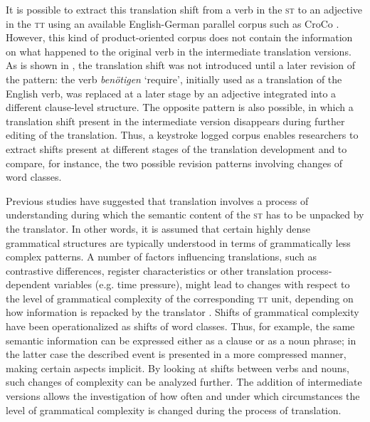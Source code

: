 \documentclass[output=paper]{LSP/langsci}
\begin{document}
It is possible to extract this translation shift from a verb in the \textsc{st} to an adjective in the \textsc{tt} using an available English-German parallel corpus such as CroCo \citep{Hansen-Schirra2012}. However, this kind of product-oriented corpus does not contain the information on what happened to the original verb in the intermediate translation versions. As is shown in , the translation shift was not introduced until a later revision of the pattern: the verb \textit{benötigen} `require', initially used as a translation of the English verb, was replaced at a later stage by an adjective integrated into a different clause-level structure. The opposite pattern is also possible, in which a translation shift present in the intermediate version disappears during further editing of the translation. Thus, a keystroke logged corpus enables researchers to extract shifts present at different stages of the translation development and to compare, for instance, the two possible revision patterns involving changes of word classes.
  
Previous studies have suggested that translation involves a process of understanding during which the semantic content of the \textsc{st} has to be unpacked by the translator. In other words, it is assumed that certain highly dense grammatical structures are typically understood in terms of grammatically less complex patterns. A number of factors influencing translations, such as contrastive differences, register characteristics or other translation process-dependent variables (e.g. time pressure), might lead to changes with respect to the level of grammatical complexity of the corresponding \textsc{tt} unit, depending on how information is repacked by the translator \citep{Steiner2001,Hansen-Schirra2012}. Shifts of grammatical complexity have been operationalized as shifts of word classes. Thus, for example, the same semantic information can be expressed either as a clause or as a noun phrase; in the latter case the described event is presented in a more compressed manner, making certain aspects implicit. By looking at shifts between verbs and nouns, such changes of complexity can be analyzed further. The addition of intermediate versions allows the investigation of how often and under which circumstances the level of grammatical complexity is changed during the process of translation. 
\end{document}
